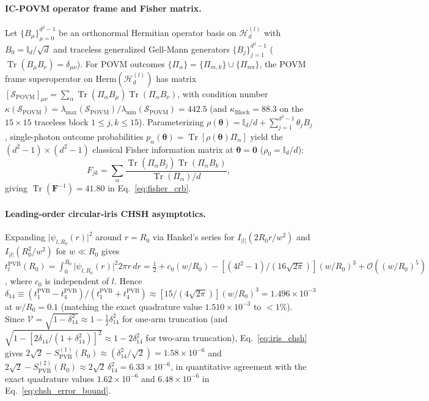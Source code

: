 \documentclass[aps,pra,onecolumn,notitlepage,11pt,tightenlines,nofootinbib,floatfix,longbibliography]{revtex4-2}
\newcommand{\abs}[1]{\lvert #1 \rvert}
\begin{document}
\paragraph*{IC-POVM operator frame and Fisher matrix.}
Let $\{B_\mu\}_{\mu=0}^{d^2-1}$ be an orthonormal Hermitian operator basis on $\mathcal{H}_d^{(l)}$ with $B_0 = \mathbb{I}_d/\sqrt{d}$ and traceless generalized Gell-Mann generators $\{B_j\}_{j=1}^{d^2-1}$ ($\operatorname{Tr}(B_\mu B_\nu) = \delta_{\mu\nu}$). For POVM outcomes $\{\Pi_\alpha\} = \{\Pi_{m,k}\} \cup \{\Pi_{\mathrm{res}}\}$, the POVM frame superoperator on $\mathrm{Herm}(\mathcal{H}_d^{(l)})$ has matrix $[\mathcal{S}_{\mathrm{POVM}}]_{\mu\nu} = \sum_\alpha \operatorname{Tr}(\Pi_\alpha B_\mu)\operatorname{Tr}(\Pi_\alpha B_\nu)$, with condition number $\kappa(\mathcal{S}_{\mathrm{POVM}}) = \lambda_{\max}(\mathcal{S}_{\mathrm{POVM}})/\lambda_{\min}(\mathcal{S}_{\mathrm{POVM}}) = 442.5$ (and $\kappa_{\mathrm{Bloch}} = 88.3$ on the $15\times 15$ traceless block $1 \le j,k \le 15$). Parameterizing $\rho(\boldsymbol{\theta}) = \mathbb{I}_d/d + \sum_{j=1}^{d^2-1}\theta_j B_j$, single-photon outcome probabilities $p_\alpha(\boldsymbol{\theta}) = \operatorname{Tr}[\rho(\boldsymbol{\theta})\Pi_\alpha]$ yield the $(d^2-1)\times(d^2-1)$ classical Fisher information matrix at $\boldsymbol{\theta} = \mathbf{0}$ ($\rho_0 = \mathbb{I}_d/d$):
\begin{equation}
F_{jk} = \sum_\alpha \frac{\operatorname{Tr}(\Pi_\alpha B_j)\operatorname{Tr}(\Pi_\alpha B_k)}{\operatorname{Tr}(\Pi_\alpha)/d},
\label{eq:app_fisher}
\end{equation}
giving $\operatorname{Tr}(\mathbf{F}^{-1}) = 41.80$ in Eq.~\eqref{eq:fisher_crb}.

\paragraph*{Leading-order circular-iris CHSH asymptotics.}
Expanding $\abs{\psi_{l,R_0}(r)}^2$ around $r = R_0$ via Hankel's series for $I_{\abs{l}}(2R_0 r/w^2)$ and $I_{\abs{l}}(R_0^2/w^2)$ for $w \ll R_0$ gives $t_l^{\mathrm{PVB}}(R_0) = \int_0^{R_0}\abs{\psi_{l,R_0}(r)}^2 2\pi r\,dr = \frac{1}{2} + c_0(w/R_0) - [(4l^2 - 1)/(16\sqrt{2\pi})](w/R_0)^3 + \mathcal{O}((w/R_0)^5)$, where $c_0$ is independent of $l$. Hence $\delta_{14} \equiv (t_1^{\mathrm{PVB}} - t_4^{\mathrm{PVB}})/(t_1^{\mathrm{PVB}} + t_4^{\mathrm{PVB}}) \approx [15/(4\sqrt{2\pi})](w/R_0)^3 = 1.496\times 10^{-3}$ at $w/R_0 = 0.1$ (matching the exact quadrature value $1.510\times 10^{-3}$ to $<1\%$). Since $\mathcal{V} = \sqrt{1 - \delta_{14}^2} \approx 1 - \frac{1}{2}\delta_{14}^2$ for one-arm truncation (and $\sqrt{1 - [2\delta_{14}/(1+\delta_{14}^2)]^2} \approx 1 - 2\delta_{14}^2$ for two-arm truncation), Eq.~\eqref{eq:iris_chsh} gives $2\sqrt{2} - S_{\mathrm{PVB}}^{(1)}(R_0) \approx (\delta_{14}^2/\sqrt{2}) = 1.58\times 10^{-6}$ and $2\sqrt{2} - S_{\mathrm{PVB}}^{(2)}(R_0) \approx 2\sqrt{2}\,\delta_{14}^2 = 6.33\times 10^{-6}$, in quantitative agreement with the exact quadrature values $1.62\times 10^{-6}$ and $6.48\times 10^{-6}$ in Eq.~\eqref{eq:chsh_error_bound}.


\end{document}
